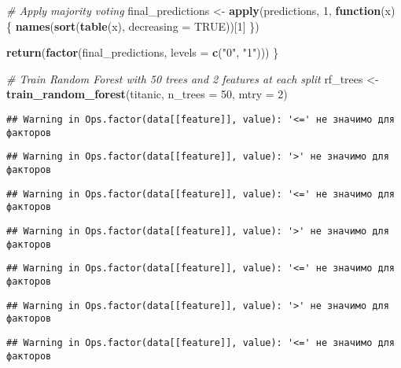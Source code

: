 \documentclass[
]{article}
\newenvironment{Shaded}{\begin{snugshade}}{\end{snugshade}}
\newcommand{\AttributeTok}[1]{\textcolor[rgb]{0.13,0.29,0.53}{#1}}
\newcommand{\CommentTok}[1]{\textcolor[rgb]{0.56,0.35,0.01}{\textit{#1}}}
\newcommand{\ConstantTok}[1]{\textcolor[rgb]{0.56,0.35,0.01}{#1}}
\newcommand{\ControlFlowTok}[1]{\textcolor[rgb]{0.13,0.29,0.53}{\textbf{#1}}}
\newcommand{\DecValTok}[1]{\textcolor[rgb]{0.00,0.00,0.81}{#1}}
\newcommand{\FunctionTok}[1]{\textcolor[rgb]{0.13,0.29,0.53}{\textbf{#1}}}
\newcommand{\NormalTok}[1]{#1}
\newcommand{\OtherTok}[1]{\textcolor[rgb]{0.56,0.35,0.01}{#1}}
\newcommand{\StringTok}[1]{\textcolor[rgb]{0.31,0.60,0.02}{#1}}
\begin{document}
\begin{Shaded}
\begin{Highlighting}[]
  \CommentTok{\# Apply majority voting}
\NormalTok{  final\_predictions }\OtherTok{\textless{}{-}} \FunctionTok{apply}\NormalTok{(predictions, }\DecValTok{1}\NormalTok{, }\ControlFlowTok{function}\NormalTok{(x) \{}
    \FunctionTok{names}\NormalTok{(}\FunctionTok{sort}\NormalTok{(}\FunctionTok{table}\NormalTok{(x), }\AttributeTok{decreasing =} \ConstantTok{TRUE}\NormalTok{))[}\DecValTok{1}\NormalTok{]}
\NormalTok{  \})}
  
  \FunctionTok{return}\NormalTok{(}\FunctionTok{factor}\NormalTok{(final\_predictions, }\AttributeTok{levels =} \FunctionTok{c}\NormalTok{(}\StringTok{"0"}\NormalTok{, }\StringTok{"1"}\NormalTok{)))}
\NormalTok{\}}

\CommentTok{\# Train Random Forest with 50 trees and 2 features at each split}
\NormalTok{rf\_trees }\OtherTok{\textless{}{-}} \FunctionTok{train\_random\_forest}\NormalTok{(titanic, }\AttributeTok{n\_trees =} \DecValTok{50}\NormalTok{, }\AttributeTok{mtry =} \DecValTok{2}\NormalTok{)}
\end{Highlighting}
\end{Shaded}

\begin{verbatim}
## Warning in Ops.factor(data[[feature]], value): '<=' не значимо для факторов
\end{verbatim}

\begin{verbatim}
## Warning in Ops.factor(data[[feature]], value): '>' не значимо для факторов
\end{verbatim}

\begin{verbatim}
## Warning in Ops.factor(data[[feature]], value): '<=' не значимо для факторов
\end{verbatim}

\begin{verbatim}
## Warning in Ops.factor(data[[feature]], value): '>' не значимо для факторов
\end{verbatim}

\begin{verbatim}
## Warning in Ops.factor(data[[feature]], value): '<=' не значимо для факторов
\end{verbatim}

\begin{verbatim}
## Warning in Ops.factor(data[[feature]], value): '>' не значимо для факторов
\end{verbatim}

\begin{verbatim}
## Warning in Ops.factor(data[[feature]], value): '<=' не значимо для факторов
\end{verbatim}
\end{document}
